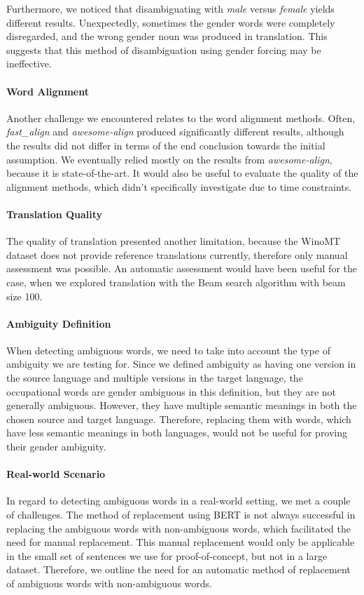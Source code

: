 Furthermore, we noticed that disambiguating with \textit{male} versus \textit{female} yields different results. Unexpectedly, sometimes the gender words were completely disregarded, and the wrong gender noun was produced in translation. This suggests that this method of disambiguation using gender forcing may be ineffective.

\paragraph{Word Alignment}
Another challenge we encountered relates to the word alignment methods. Often, \textit{fast\_align} and \textit{awesome-align} produced significantly different results, although the results did not differ in terms of the end conclusion towards the initial assumption. We eventually relied mostly on the results from \textit{awesome-align}, because it is state-of-the-art. It would also be useful to evaluate the quality of the alignment methods, which didn't specifically investigate due to time constraints.

\paragraph{Translation Quality}
The quality of translation presented another limitation, because the WinoMT dataset does not provide reference translations currently, therefore only manual assessment was possible. An automatic assessment would have been useful for the case, when we explored translation with the Beam search algorithm with beam size 100.

\paragraph{Ambiguity Definition}
When detecting ambiguous words, we need to take into account the type of ambiguity we are testing for. Since we defined ambiguity as having one version in the source language and multiple versions in the target language, the occupational words are gender ambiguous in this definition, but they are not generally ambiguous. However, they have multiple semantic meanings in both the chosen source and target language. Therefore, replacing them with words, which have less semantic meanings in both languages, would not be useful for proving their gender ambiguity.

\paragraph{Real-world Scenario}
In regard to detecting ambiguous words in a real-world setting, we met a couple of challenges. The method of replacement using BERT is not always successful in replacing the ambiguous words with non-ambiguous words, which facilitated the need for manual replacement. This manual replacement would only be applicable in the small set of sentences we use for proof-of-concept, but not in a large dataset. Therefore, we outline the need for an automatic method of replacement of ambiguous words with non-ambiguous words. 

